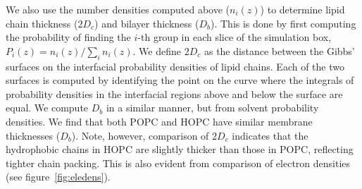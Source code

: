 \documentclass[12pt,preprint,times,openany,draft]{book}
\begin{document}
We also use the number densities computed above ($n_i(z)$) to determine lipid chain 
thickness ($2D_c$) and bilayer thickness ($D_b$). This is done by first computing the probability of
finding the $i$-th group in each slice of the simulation box,
$P_i(z)={n_i(z)}/{\sum_i n_i(z)}$. We define $2D_c$ as the distance between the Gibbs' surfaces on the 
interfacial probability densities of lipid chains. Each of the two surfaces is computed by identifying the
point on the curve where 
the integrals of probability densities in the interfacial regions above and below the surface are equal. 
We compute $D_b$ in a similar manner, but from solvent probability densities. 
We find that both POPC and HOPC have similar membrane thicknesses ($D_b$). Note, however, comparison of $2D_c$ 
indicates that the hydrophobic chains in HOPC are slightly thicker than those in POPC, reflecting tighter chain packing. This 
is also evident from comparison of electron densities (see figure~\ref{fig:eledens}). 
\end{document}
